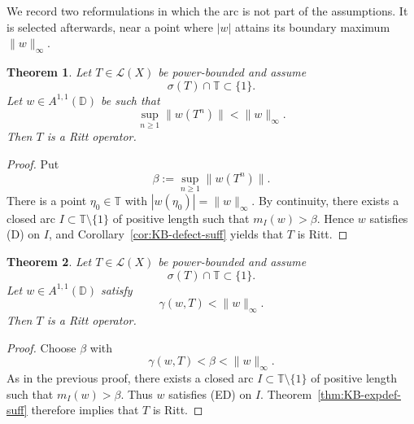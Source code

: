 \documentclass[11pt]{amsart}
\numberwithin{equation}{section}
\newtheorem{theorem}{Theorem}[section]
\theoremstyle{definition}
\theoremstyle{plain}
\def\T{\mathbb{T}}
\def\L{L}
\def\D{\mathbb{D}}
\renewcommand{\L}{\mathcal L}
\begin{document}
We record two reformulations in which the arc is not part of the assumptions.
It is selected afterwards, near a point where \(|w|\) attains its boundary
maximum \(\|w\|_\infty\).



\begin{theorem}
\label{thm:KB-defect-supnorm}
Let $T\in\L(X)$ be power-bounded and assume
\[
  \sigma(T)\cap\T\subset\{1\}.
\]
Let $w\in A^{1,1}(\D)$ be such that
\[
  \sup_{n\ge1}\|w(T^n)\|<\|w\|_\infty.
\]
Then $T$ is a Ritt operator.
\end{theorem}

\begin{proof}
Put
\[
        \beta:=\sup_{n\ge1}\|w(T^n)\|.
\]
There is a point $\eta_0\in\T$ with $|w(\eta_0)|=\|w\|_\infty$. %
By continuity, there exists a closed arc
$I\subset\T\setminus\{1\}$ of positive length such that $m_I(w)>\beta$.
Hence $w$ satisfies \textup{(D)} on $I$, and Corollary~\ref{cor:KB-defect-suff}
yields that $T$ is Ritt.
\end{proof}

\begin{theorem}
\label{thm:KB-expdef-supnorm}
Let $T\in\L(X)$ be power-bounded and assume
\[
  \sigma(T)\cap\T\subset\{1\}.
\]
Let $w\in A^{1,1}(\D)$ satisfy 
\[
  \gamma(w,T)<\|w\|_\infty.
\]
Then $T$ is a Ritt operator.
\end{theorem}

\begin{proof}
Choose $\beta$ with
\[
        \gamma(w,T)<\beta<\|w\|_\infty .
\]
As in the previous proof, %
there exists a closed arc
$I\subset\T\setminus\{1\}$ of positive length such that $m_I(w)>\beta$.
Thus $w$ satisfies \textup{(ED)} on $I$. Theorem~\ref{thm:KB-expdef-suff}
therefore implies that $T$ is Ritt.
\end{proof}
\end{document}
